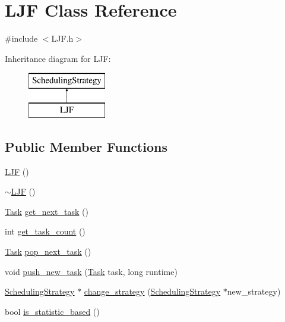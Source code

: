 \hypertarget{class_l_j_f}{}\section{L\+J\+F Class Reference}
\label{class_l_j_f}


{\ttfamily \#include $<$L\+J\+F.\+h$>$}

Inheritance diagram for L\+J\+F\+:\begin{figure}[H]
\begin{center}
\leavevmode
\includegraphics[height=2.000000cm]{class_l_j_f}
\end{center}
\end{figure}
\subsection*{Public Member Functions}
\begin{DoxyCompactItemize}
\item 
\hyperlink{class_l_j_f_ae8c4fa391d8767a5fba0bfb3ad3da8db}{L\+J\+F} ()
\item 
\hyperlink{class_l_j_f_a5ad18e75f4069623320bc72e3ec6e4ce}{$\sim$\+L\+J\+F} ()
\item 
\hyperlink{_types_8h_a0c77930ab3818a1680c59353f627fba8}{Task} \hyperlink{class_l_j_f_a24a4c6bfba65ef98753242c1f068b9fd}{get\+\_\+next\+\_\+task} ()
\item 
int \hyperlink{class_l_j_f_a329055147464eb68940c0541aba5946e}{get\+\_\+task\+\_\+count} ()
\item 
\hyperlink{_types_8h_a0c77930ab3818a1680c59353f627fba8}{Task} \hyperlink{class_l_j_f_af12a29f8a65fea1de0a2f436fd2b8b2b}{pop\+\_\+next\+\_\+task} ()
\item 
void \hyperlink{class_l_j_f_a4661c55d31322bc7755227890ca8679c}{push\+\_\+new\+\_\+task} (\hyperlink{_types_8h_a0c77930ab3818a1680c59353f627fba8}{Task} task, long runtime)
\item 
\hyperlink{class_scheduling_strategy}{Scheduling\+Strategy} $\ast$ \hyperlink{class_l_j_f_aaf5029dba4a8200d49f9b6bd47e71acd}{change\+\_\+strategy} (\hyperlink{class_scheduling_strategy}{Scheduling\+Strategy} $\ast$new\+\_\+strategy)
\item 
bool \hyperlink{class_l_j_f_a9292614934e9dc35f7c4ea568bcdcd4c}{is\+\_\+statistic\+\_\+based} ()
\end{DoxyCompactItemize}
